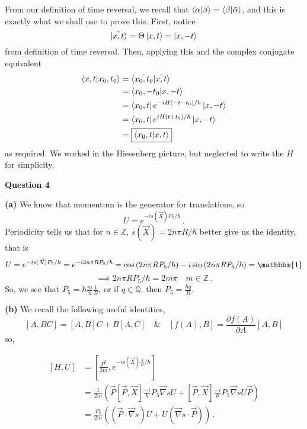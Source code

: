 \documentclass[10pt]{article}
\newcommand{\Z}{\mathbb{Z}}
\newcommand{\Q}{\mathbb{Q}}
\begin{document}
From our definition of time reversal, we recall that $\braket{\alpha|\beta} = \braket{\tilde{\beta}|\tilde{\alpha}}$, and this is exactly what we shall use to prove this. First, notice
\[ \ket{\tilde{x,t}} = \Theta\ket{x,t} = \ket{x,-t} \]
from definition of time reversal. Then, applying this and the complex conjugate equivalent
\begin{equation*}
  \begin{split}
    \braket{x,t|x_{0},t_{0}} & = \braket{\tilde{x_{0},t_{0}}|\tilde{x,t}} \\
    & = \braket{x_{0},-t_{0}|x,-t} \\
    & = \bra{x_{0},t}e^{-iH(-t-t_{0})/\hbar}\ket{x,-t} \\
    & = \bra{x_{0},t}e^{iH(t+t_{0})/\hbar}\ket{x,-t} \\
    & = \boxed{\braket{x_{0},t|x,t}} \\
  \end{split}
\end{equation*}
as required. We worked in the Hiesenberg picture, but neglected to write the $H$ for simplicity. 

\textbf{Question 4}

\textbf{(a)} We know that momentum is the generator for translations, so
\[ U = e^{ -i s(\vec{X}) P_{5}/\hbar} \, .\]
Periodicity tells us that for $n \in \Z$, $s(\vec{X}) = 2n\pi R/\hbar$ better give us the identity, that is
\[ U = e^{ -i s(\vec{X}) P_{5}/\hbar} = e^{ -i 2n\pi RP_{5}/\hbar} = \cos\left(2n\pi RP_{5}/\hbar\right) - i\sin\left(2n\pi RP_{5}/\hbar\right) = \mathbbm{1} \]
\[ \implies 2n\pi RP_{5}/\hbar = 2m\pi \quad m \in \Z\, .\]
So, we see that $P_{5} = \hbar\frac{m}{n}\frac{1}{R}$, or if $q\in \Q$, then $\boxed{P_{5} = \frac{\hbar q}{R}}$.

\textbf{(b)} We recall the following useful identities,
\[ [A,BC] = [A,B]C + B[A,C] \quad \& \quad [f(A), B] = \frac{\partial f(A)}{\partial A}[A,B]\]
so,

\begin{equation*}
  \begin{split}
    [H,U] & = \left[\frac{P^{2}}{2m},e^{-is(\vec{X})\frac{q}{R}/\hbar}\right] \\
    & = \frac{1}{2m}\left(\vec{P}[\vec{P},\vec{X}]\frac{-i}{\hbar}P_{5}\vec{\nabla}s U + [\vec{P},\vec{X}]\frac{-i}{\hbar}P_{5}\vec{\nabla}s U\vec{P}\right) \\
    & = \boxed{\frac{P_{5}}{2m}\left((\vec{P}\cdot \vec{\nabla}s)U + U(\vec{\nabla}s \cdot \vec{P})\right)}\, . \\
   \end{split}
\end{equation*}
\end{document}
